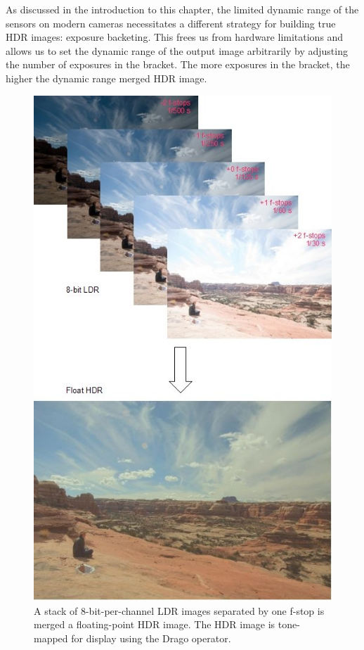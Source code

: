 As discussed in the introduction to this chapter, the limited dynamic
range of the sensors on modern cameras necessitates a different
strategy for building true HDR images: exposure backeting.  This frees
us from hardware limitations and allows us to set the dynamic range of
the output image arbitrarily by adjusting the number of exposures in
the bracket.  The more exposures in the bracket, the higher the
dynamic range merged HDR image.

\begin{figure}[tbp]
\begin{center}
  \includegraphics[width=5in]{images/hdr_merge.jpg}
 \end{center}
  \caption{A stack of 8-bit-per-channel LDR images separated by one
    f-stop is merged a floating-point HDR image. The HDR image is
    tone-mapped for display using the Drago operator.}
  \label{fig:hdrmerge}
\end{figure}

